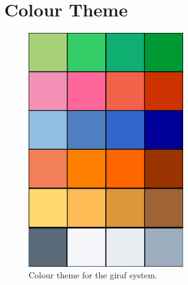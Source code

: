 \chapter{Colour Theme}
\label{chap:colorTheme}
\vspace{-5mm}
\begin{figure}[!h]
\centering
\includegraphics[width=0.6\textwidth]{images/colorTheme.png}
\caption{Colour theme for the \ac{giraf} system.}
\end{figure}
